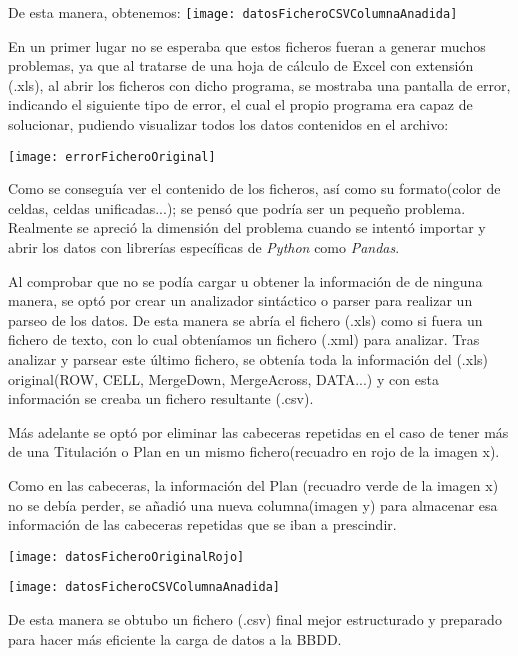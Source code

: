 De esta manera, obtenemos:
\texttt{[image: datosFicheroCSVColumnaAnadida]}





En un primer lugar no se esperaba que estos ficheros fueran a generar muchos problemas, ya que al tratarse de una hoja de cálculo de Excel con extensión (.xls), al abrir los ficheros con dicho programa, se mostraba una pantalla de error, indicando el siguiente tipo de error, el cual el propio programa era capaz de solucionar, pudiendo visualizar todos los datos contenidos en el archivo:



\texttt{[image: errorFicheroOriginal]}

Como se conseguía ver el contenido de los ficheros, así como su formato(color de celdas, celdas unificadas...); se pensó que podría ser un pequeño problema. Realmente se apreció la dimensión del problema cuando se intentó importar y abrir los datos con librerías específicas de \emph{Python} como \emph{Pandas}.

Al comprobar que no se podía cargar u obtener la información de de ninguna manera, se optó por crear un analizador sintáctico o parser para realizar un parseo de los datos. De esta manera se abría el fichero (.xls) como si fuera un fichero de texto, con lo cual obteníamos un fichero (.xml) para analizar. Tras analizar y parsear este último fichero, se obtenía toda la información del (.xls) original(ROW, CELL, MergeDown, MergeAcross, DATA...) y con esta información se creaba un fichero resultante (.csv). 

Más adelante se optó por eliminar las cabeceras repetidas en el caso de tener más de una Titulación o Plan en un mismo fichero(recuadro en rojo de la imagen x).


Como en las cabeceras, la información del Plan (recuadro verde de la imagen x) no se debía perder, se añadió una nueva columna(imagen y) para almacenar esa información de las cabeceras repetidas que se iban a prescindir.

\texttt{[image: datosFicheroOriginalRojo]}


\texttt{[image: datosFicheroCSVColumnaAnadida]}


De esta manera se obtubo un fichero (.csv) final mejor estructurado y preparado para hacer más eficiente la carga de datos a la BBDD.


  

